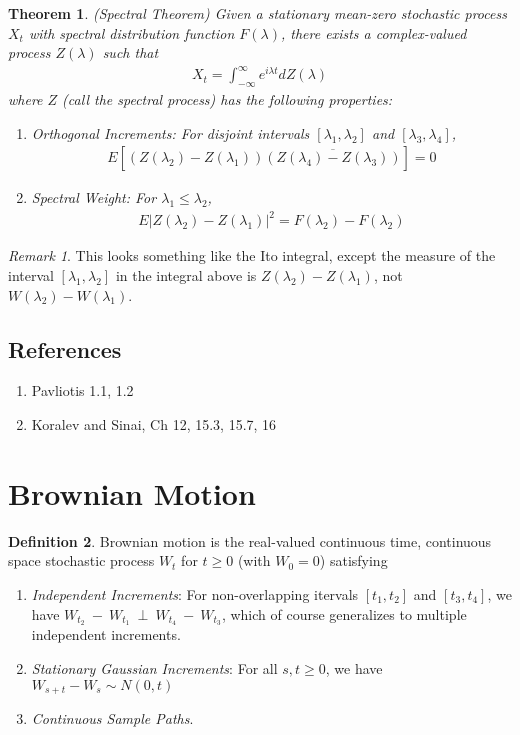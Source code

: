 \documentclass[12pt]{article}
\theoremstyle{plain}
\newtheorem{thm}{Theorem}[section]
\theoremstyle{definition}
\newtheorem{defn}[thm]{Definition}
\theoremstyle{remark}
\newtheorem*{rmk}{Remark}
\begin{document}
\begin{thm}\emph{(Spectral Theorem)}
Given a stationary mean-zero stochastic process $X_t$ with spectral
distribution function $F(\lambda)$, there exists a complex-valued
process $Z(\lambda)$ such that
\begin{align*}
  X_t = \int^\infty_{-\infty} e^{i\lambda t} dZ(\lambda)
\end{align*}
where $Z$ (call the \emph{spectral process}) has the following
properties:
\begin{enumerate}
  \item Orthogonal Increments: For disjoint intervals
    $[\lambda_1,\lambda_2]$ and $[\lambda_3,\lambda_4]$,
    \begin{align*}
      E\left[
        (Z(\lambda_2)-Z(\lambda_1))
        \overline{(Z(\lambda_4)-Z(\lambda_3))}
      \right] = 0
    \end{align*}
  \item Spectral Weight: For $\lambda_1\leq \lambda_2$,
    \begin{align*}
      E\left\lvert Z(\lambda_2)-Z(\lambda_1)\right\rvert^2
      = F(\lambda_2)-F(\lambda_2)
    \end{align*}
\end{enumerate}
\end{thm}
\begin{rmk}
This looks something like the Ito integral, except the measure of the
interval $[\lambda_1,\lambda_2]$ in the integral above is
$Z(\lambda_2)-Z(\lambda_1)$, not $W(\lambda_2)-W(\lambda_1)$.
\end{rmk}

\subsection{References}
\begin{enumerate}
  \item Pavliotis 1.1, 1.2
  \item Koralev and Sinai, Ch 12, 15.3, 15.7, 16
\end{enumerate}

\section{Brownian Motion}

\begin{defn}
Brownian motion is the real-valued continuous time, continuous space
stochastic process $W_t$ for $t\geq 0$ (with $W_0=0$) satisfying
\begin{enumerate}
  \item \emph{Independent Increments}: For non-overlapping itervals
    $[t_1,t_2]$ and $[t_3,t_4]$, we have
    $W_{t_2}~-~W_{t_1}~\perp~W_{t_4}~-~W_{t_3}$,
    which of course generalizes to multiple independent increments.
  \item \emph{Stationary Gaussian Increments}: For all $s,t\geq 0$, we
    have $W_{s+t}-W_s\sim N(0,t)$
  \item \emph{Continuous Sample Paths}.
\end{enumerate}
\end{defn}
\end{document}
